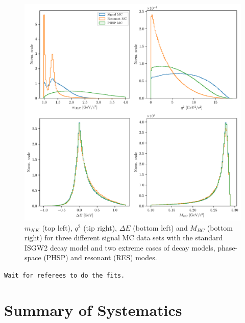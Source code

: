 \begin{figure}[H]
	\centering
	\captionsetup{width=0.8\linewidth}
	\includegraphics[width=\linewidth]{fig/model_cases}
	\caption{$m_{KK}$ (top left), $q^2$ (tip right), $\Delta E$ (bottom left) and $M_{BC}$ (bottom right) for three different signal MC data sets with the standard ISGW2 decay model and two extreme cases of decay models, phase-space (PHSP) and resonant (RES) modes.}
	\label{fig:model_cases}
\end{figure}

\texttt{Wait for referees to do the fits.}

\section{Summary of Systematics}





